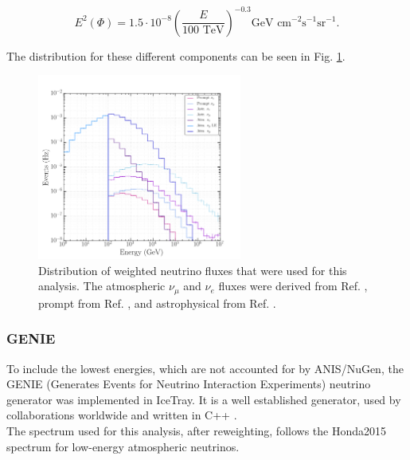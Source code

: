 \begin{equation}
E^2 \left(\Phi \right) = 1.5 \cdot 10^{-8} \left( \frac{E}{100 \textrm{ TeV}} \right)^{-0.3} \textrm{GeV } \textrm{cm}^{-2} \textrm{s}^{-1} \textrm{sr}^{-1}.
\end{equation}

\noindent The distribution for these different components can be seen in Fig. \ref{fig:neutrinospectrum}.

\begin{figure}
\centering
\includegraphics[width=0.6\textwidth]{chapter6/img/neutrinoenergy.png}
\caption{Distribution of weighted neutrino fluxes that were used for this analysis. The atmospheric $\nu_\mu$ and $\nu_e$ fluxes were derived from Ref. \cite{Honda:2006qj}, prompt from Ref. \cite{Enberg:2008te}, and astrophysical from Ref. \cite{Aartsen:2014gkd}.}
\label{fig:neutrinospectrum}
\end{figure}

\subsubsection{GENIE}
To include the lowest energies, which are not accounted for by ANIS/NuGen, the GENIE (Generates Events for Neutrino Interaction Experiments) neutrino generator was implemented in IceTray. It is a well established generator, used by collaborations worldwide and written in C++ \cite{Andreopoulos:2009rq,Andreopoulos:2015wxa}.\\

\noindent The spectrum used for this analysis, after reweighting, follows the Honda2015 spectrum \cite{Honda:2015fha} for low-energy atmospheric neutrinos.


